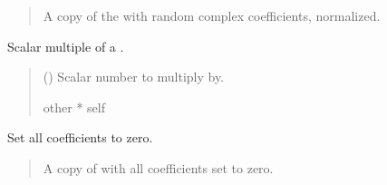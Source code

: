 \documentclass[letterpaper,10pt,english]{sphinxmanual}
\begin{document}
\begin{fulllineitems}
\begin{fulllineitems}
\begin{quote}
\begin{description}
\sphinxAtStartPar
A copy of the  with random complex coefficients, normalized.

\sphinxAtStartPar
{\hyperref[\detokenize{spinbox:spinbox.core.HilbertState}]{}}

\end{description}\end{quote}

\end{fulllineitems}


\begin{fulllineitems}
\label{\detokenize{spinbox:spinbox.core.HilbertState.scale}}
\pysigstartsignatures
{}
\pysigstopsignatures
\sphinxAtStartPar
Scalar multiple of a .
\begin{quote}\begin{description}
\sphinxAtStartPar
{} () \textendash{} Scalar number to multiply by.

\sphinxAtStartPar
other * self

\sphinxAtStartPar
{\hyperref[\detokenize{spinbox:spinbox.core.HilbertState}]{}}

\end{description}\end{quote}

\end{fulllineitems}


\begin{fulllineitems}
\label{\detokenize{spinbox:spinbox.core.HilbertState.zero}}
\pysigstartsignatures
{}
\pysigstopsignatures
\sphinxAtStartPar
Set all coefficients to zero.
\begin{quote}\begin{description}
\sphinxAtStartPar
A copy of  with all coefficients set to zero.


\end{description}
\end{quote}
\end{fulllineitems}
\end{fulllineitems}
\end{document}
